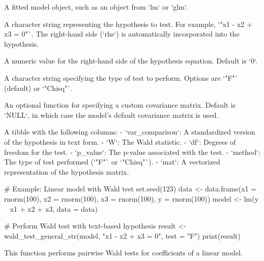 \documentclass[a4paper]{book}
\begin{document}
\begin{Arguments}
\begin{ldescription}
\item[\code{model}] A fitted model object, such as an object from `lm` or `glm`.

\item[\code{hypothesis}] A character string representing the hypothesis to test.
For example, `"x1 - x2 + x3 = 0"`. The right-hand side (`rhs`) is
automatically incorporated into the hypothesis.

\item[\code{rhs}] A numeric value for the right-hand side of the hypothesis equation.
Default is `0`.

\item[\code{test}] A character string specifying the type of test to perform. Options
are `"F"` (default) or `"Chisq"`.

\item[\code{vcov\_func}] An optional function for specifying a custom covariance matrix.
Default is `NULL`, in which case the model's default covariance matrix is used.
\end{ldescription}
\end{Arguments}
%
\begin{Value}
A tibble with the following columns:
- `var\_comparison`: A standardized version of the hypothesis in text form.
- `W`: The Wald statistic.
- `df`: Degrees of freedom for the test.
- `p\_value`: The p-value associated with the test.
- `method`: The type of test performed (`"F"` or `"Chisq"`).
- `mat`: A vectorized representation of the hypothesis matrix.
\end{Value}
%
\begin{Examples}
\begin{ExampleCode}
# Example: Linear model with Wald test
set.seed(123)
data <- data.frame(x1 = rnorm(100), x2 = rnorm(100), x3 = rnorm(100), y = rnorm(100))
model <- lm(y ~ x1 + x2 + x3, data = data)

# Perform Wald test with text-based hypothesis
result <- wald_test_general_str(model, "x1 - x2 + x3 = 0", test = "F")
print(result)

\end{ExampleCode}
\end{Examples}
%
\begin{Description}
This function performs pairwise Wald tests for coefficients of a linear model.
\end{Description}
\end{document}
